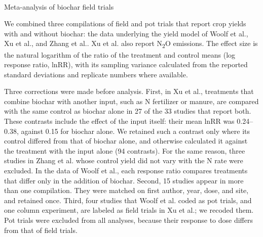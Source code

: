 \documentclass[
  letterpaper,
  twoside,
  twocolumn,
  9pt]{article}
\makeatletter
\let\oldparagraph\paragraph
\renewcommand{\paragraph}{
    \@ifstar
      \xxxParagraphStar
      \xxxParagraphNoStar
  }
\newcommand{\xxxParagraphStar}[1]{\oldparagraph*{#1}\mbox{}}
\newcommand{\xxxParagraphNoStar}[1]{\oldparagraph{#1}\mbox{}}
\makeatother
\begin{document}
\paragraph{Meta-analysis of biochar field
trials}\label{meta-analysis-of-biochar-field-trials}

We combined three compilations of field and pot trials that report crop
yields with and without biochar: the data underlying the yield model of
Woolf et al.\citep{woolf2016optimal}, Xu et al.\citep{xu2021}, and Zhang
et al.\citep{zhang2023}. Xu et al.\citep{xu2021} also report
N\textsubscript{2}O emissions. The effect size is the natural logarithm
of the ratio of the treatment and control means (log response ratio,
lnRR), with its sampling variance calculated from the reported standard
deviations and replicate numbers where available.

Three corrections were made before analysis. First, in Xu et
al.\citep{xu2021}, treatments that combine biochar with another input,
such as N fertilizer or manure, are compared with the same control as
biochar alone in 27 of the 33 studies that report both. These contrasts
include the effect of the input itself: their mean lnRR was 0.24--0.38,
against 0.15 for biochar alone. We retained such a contrast only where
its control differed from that of biochar alone, and otherwise
calculated it against the treatment with the input alone (94 contrasts).
For the same reason, three studies in Zhang et al.\citep{zhang2023}
whose control yield did not vary with the N rate were excluded. In the
data of Woolf et al.\citep{woolf2016optimal}, each response ratio
compares treatments that differ only in the addition of biochar. Second,
15 studies appear in more than one compilation. They were matched on
first author, year, dose, and site, and retained once. Third, four
studies that Woolf et al.\citep{woolf2016optimal} coded as pot trials,
and one column experiment, are labeled as field trials in Xu et
al.\citep{xu2021}; we recoded them. Pot trials were excluded from all
analyses, because their response to dose differs from that of field
trials.
\end{document}
